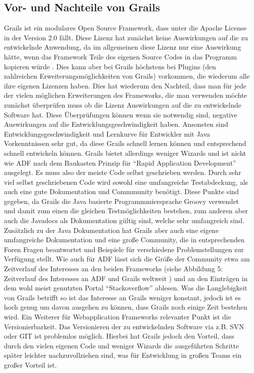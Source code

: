 \subsection{Vor- und Nachteile von Grails}
Grails ist ein modulares Open Source Framework, dass unter die Apache License in der Version 2.0 fällt. Diese Lizenz hat zunächst keine Auswirkungen auf die zu entwickelnde Anwendung, da im allgemeinen diese Lizenz nur eine Auswirkung hätte, wenn das Framework Teile des eigenen Source Codes in das Programm kopieren würde \citep{AL2015}. Dies kann aber bei Grails höchstens bei Plugins (den zahlreichen Erweiterungsmöglichkeiten von Grails) vorkommen, die wiederum alle ihre eigenen Lizenzen haben. Dies hat wiederum den Nachteil, dass man für jede der vielen möglichen Erweiterungen des Frameworks, die man verwenden möchte zunächst überprüfen muss ob die Lizenz Auswirkungen auf die zu entwickelnde Software hat. Diese Überprüfungen können wenn sie notwendig sind, negative Auswirkungen auf die Entwicklungsgeschwindigkeit haben. Ansonsten sind Entwicklungsgeschwindigkeit und Lernkurve für Entwickler mit Java Vorkenntnissen sehr gut, da diese Grails schnell lernen können und entsprechend schnell entwickeln können. Grails bietet allerdings weniger Wizards und ist nicht wie ADF nach dem Baukasten Prinzip für "`Rapid Application Development"' ausgelegt. Es muss also der meiste Code selbst geschrieben werden. Durch sehr viel selbst geschriebenen Code wird sowohl eine umfangreiche Testabdeckung, als auch eine gute Dokumentation und Commmunity benötigt. Diese Punkte sind gegeben, da Grails die Java basierte Programmmiersprache Groovy verwendet und damit zum einen die gleichen Testmöglichkeiten bestehen, zum anderen aber auch die Javadocs als Dokumentation gültig sind, welche sehr umfangreich sind. Zusätzlich zu der Java Dokumentation hat Grails aber auch eine eigene umfangreiche Dokumentation und eine große Community, die in entsprechenden Foren Fragen beantwortet und Beispiele für verschiedene Problemstellungen zur Verfügung stellt. Wie auch für ADF lässt sich die Größe der Community etwa am Zeitverlauf des Interesses an den beiden Frameworks (siehe Abbildung 5: Zeitverlauf des Interesses an ADF und Grails weltweit
) und an den Einträgen in dem wohl meist genutzten Portal "`Stackoverflow"'\citep{SOFG2015} ablesen. Was die Langlebigkeit von Grails betrifft so ist das Interesse an Grails weniger konstant, jedoch ist es hoch genug um davon ausgehen zu können, dass Grails noch einige Zeit bestehen wird. Ein Weiterer für Webapplication Frameworks relevanter Punkt ist die Versionierbarkeit. Das Versionieren der zu entwickelnden Software via z.B. SVN oder GIT ist problemlos möglich. Hierbei hat Grails jedoch den Vorteil, dass durch den vielen eigenen Code und weniger Wizards die ausgeführten Schritte später leichter nachzuvollziehen sind, was für Entwicklung in großen Teams ein großer Vorteil ist.